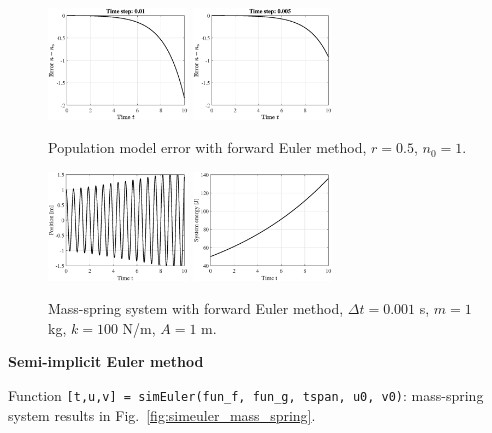 \documentclass{article}
\begin{document}
	\begin{figure}[h!]
		\centering
		\includegraphics[width=0.33\textwidth]{fwdeuler_error1.eps}
		\includegraphics[width=0.33\textwidth]{fwdeuler_error2.eps}
		\caption{Population model error with forward Euler method, $r = 0.5$, $n_0 = 1$.\label{fig:fwdeuler_population}}
	\end{figure}
	\vspace{-1ex}
	\begin{figure}[h!]
		\centering
		\includegraphics[width=0.33\textwidth]{fwdeuler_position.eps}
		\includegraphics[width=0.33\textwidth]{fwdeuler_energy.eps}
		\caption{Mass-spring system with forward Euler method, $\Delta t = 0.001$ s, $m = 1$ kg, $k = 100$ N/m, $A = 1$ m.\label{fig:fwdeuler_mass_spring}}
	\end{figure}
	
	\textbf{Semi-implicit Euler method}
	
	Function \texttt{[t,u,v] = simEuler(fun\_f, fun\_g, tspan, u0, v0)}: mass-spring system results in Fig.~\ref*{fig:simeuler_mass_spring}.
	
\end{document}
